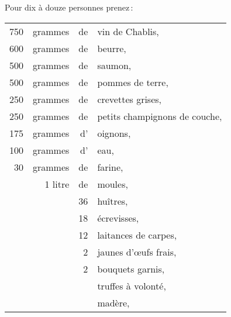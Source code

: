 Pour dix à douze personnes prenez :

\medskip

\footnotesize
\begin{longtable}{rrrp{16em}}
    750 & grammes & de & vin de Chablis,                                                                  \\
    600 & grammes & de & beurre,                                                                          \\
    500 & grammes & de & saumon,                                                                          \\
    500 & grammes & de & pommes de terre,                                                                 \\
    250 & grammes & de & crevettes grises,                                                                \\
    250 & grammes & de & petits champignons de couche,                                                    \\
    175 & grammes & d' & oignons,                                                                         \\
    100 & grammes & d' & eau,                                                                             \\
     30 & grammes & de & farine,                                                                          \\
        & 1 litre & de & moules,                                                                          \\
        &         & 36 & huîtres,                                                                         \\
        &         & 18 & écrevisses,                                                                      \\
        &         & 12 & laitances de carpes,                                                             \\
        &         &  2 & jaunes d'œufs frais,                                                             \\
        &         &  2 & bouquets garnis,                                                                 \\
        &         &    & truffes à volonté,                                                               \\
        &         &    & madère,                                                                          \\

\end{longtable}
